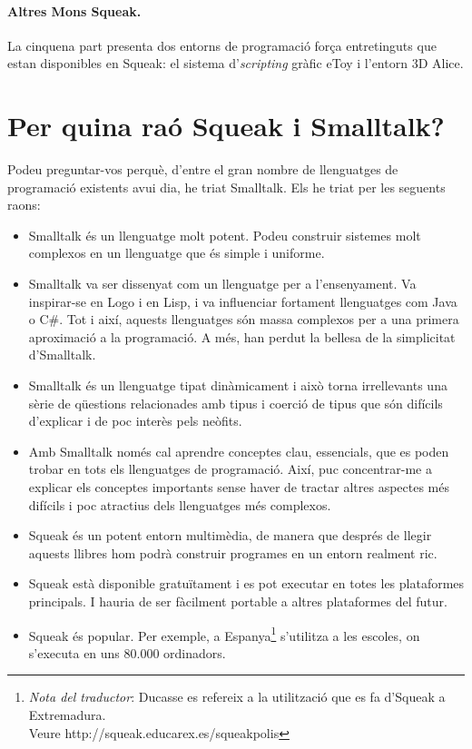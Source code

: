 \paragraph{Altres Mons Squeak.}
La cinquena part presenta dos entorns de programació força entretinguts que estan
disponibles en Squeak: el sistema d'\textit{scripting} gràfic \textsf{eToy} i l'entorn
\textsf{3D Alice}.

\section*{Per quina raó Squeak i Smalltalk?}

Podeu preguntar-vos perquè, d'entre el gran nombre de llenguatges de 
programació existents avui dia, he triat Smalltalk. Els he triat per les seguents raons:

\begin{itemize}
\item Smalltalk és un llenguatge molt potent. Podeu construir sistemes molt
complexos en un llenguatge que és simple i uniforme.
\item Smalltalk va ser dissenyat com un llenguatge per a l'ensenyament. Va inspirar-se
en Logo i en Lisp, i va influenciar fortament
llenguatges com Java o C\#. Tot i així, aquests llenguatges són massa complexos 
per a una primera aproximació a la programació. A més, han perdut la bellesa de
la simplicitat d'Smalltalk. 
\item Smalltalk és un llenguatge tipat dinàmicament i això torna irrellevants una
sèrie de qüestions relacionades amb tipus i coerció de tipus que són difícils
d'explicar i de poc interès pels neòfits.
\item Amb Smalltalk només cal aprendre conceptes clau, essencials, que es poden
trobar en tots els llenguatges de programació. Així, puc 
concentrar-me a explicar els conceptes importants sense haver de tractar altres
aspectes més difícils i poc atractius dels llenguatges més complexos.
\item Squeak és un potent entorn multimèdia, de manera que després de llegir 
aquests llibres hom podrà construir programes en un entorn 
realment ric.
\item Squeak està disponible gratuïtament i es pot executar en totes les 
plataformes principals. I hauria de ser fàcilment portable a altres
plataformes del futur.
\item Squeak és popular. Per exemple, a 
Espanya\footnote{\emph{Nota del traductor}: Ducasse es refereix a la 
utilització que es fa d'Squeak a Extremadura. \\ Veure \textsf{http://squeak.educarex.es/squeakpolis}} 
s'utilitza a les escoles, on s'executa en uns 80.000 ordinadors.
\end{itemize}

